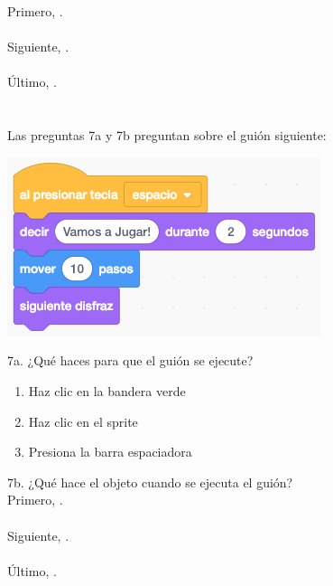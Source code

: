 \documentclass[letterpaper,12pt]{article}
\begin{document}
\noindent Primero, \hrulefill . \\ \\
Siguiente, \hrulefill . \\ \\
Último, \hrulefill . \\ \\

\noindent \dotfill \\
Las preguntas 7a y 7b preguntan sobre el guión siguiente:
\begin{center}
\includegraphics[scale=.55]{q7_script0.png}
\end{center}

\noindent 7a. ¿Qué haces para que el guión se ejecute?
\renewcommand{\theenumi}{\Alph{enumi}}
\begin{enumerate}
\item Haz clic en la bandera verde
\item Haz clic en el sprite
\item Presiona la barra espaciadora\\
\end{enumerate}

\noindent 7b. ¿Qué hace el objeto cuando se ejecuta el guión? \\

\noindent Primero, \hrulefill . \\ \\
Siguiente, \hrulefill . \\ \\
Último, \hrulefill . \\
\end{document}
